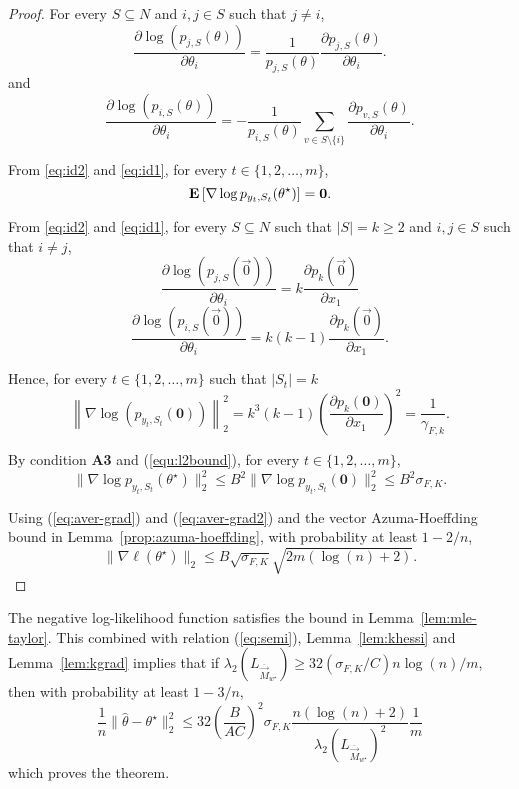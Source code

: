 \begin{proof} For every $S\subseteq N$ and $i,j\in S$ such that $j\neq i$,
\begin{equation}
\frac{\partial \log(p_{j,S} (\theta))}{\partial \theta_i} = \frac{1}{p_{j,S} (\theta)}\frac{\partial p_{j,S} (\theta)}{\partial \theta_i}.
\label{eq:id2}
\end{equation}
and
\begin{equation}
\frac{\partial \log(p_{i,S} (\theta))}{\partial \theta_i} = -\frac{1}{p_{i,S} (\theta)} \sum_{v\in S\setminus \{i\}}\frac{\partial p_{v,S} (\theta)}{\partial \theta_i}.
\label{eq:id1}
\end{equation}

From \eqref{eq:id2} and \eqref{eq:id1}, for every $t\in \{1,2,\ldots,m\}$, 
\begin{equation}
\mathbf{E}\left[\nabla \log p_{y_t,S_t} (\theta^\star) \right]  = {\bm 0}.
\label{eq:aver-grad}
\end{equation}

From \eqref{eq:id2} and \eqref{eq:id1}, for every $S\subseteq N$ such that $|S|=k\geq 2$ and $i,j\in S$ such that $i\neq j$, 
$$
\frac{\partial \log(p_{j,S}(\vec{0}))}{\partial \theta_i} = k \frac{\partial p_k(\vec{0})}{\partial x_1}
$$
$$
\frac{\partial \log(p_{i,S}(\vec{0}))}{\partial \theta_i} = k(k-1)\frac{\partial p_k(\vec{0})}{\partial x_1}.
$$

Hence, for every $t\in \{1,2,\ldots,m\}$ such that $|S_t|=k$
\begin{equation}
\left\|\nabla \log(p_{y_t,S_t} ({\bm 0})) \right\|_2^2  = k^3(k-1)\left(\frac{\partial p_k({\bm 0})}{\partial x_1}\right)^2 = \frac{1}{\gamma_{F,k}}.
\label{equ:l2bound}
\end{equation}

By condition {\bf A3} and (\ref{equ:l2bound}), for every $t\in \{1,2,\ldots,m\}$,
\begin{equation}
\|\nabla \log p_{y_t,S_t} (\theta^\star)\|_2^2 
\leq B^2 \|\nabla \log p_{y_t,S_t} ({\bm 0})\|_2^2 
\leq B^2 \sigma_{F,K}.
\label{eq:aver-grad2}
\end{equation}

Using (\ref{eq:aver-grad}) and (\ref{eq:aver-grad2}) and the vector Azuma-Hoeffding bound in Lemma~\ref{prop:azuma-hoeffding}, with probability at least $1-2/n$,
$$
\|\nabla \ell (\theta^\star) \|_2 \le B\sqrt{\sigma_{F,K}}\sqrt{2m(\log(n) +2)}.
$$
\end{proof}

The negative log-likelihood function satisfies the bound in Lemma~\ref{lem:mle-taylor}. This combined with relation (\ref{eq:semi}), Lemma~\ref{lem:khessi} and Lemma~\ref{lem:kgrad} implies that if $\lambda_2(L_{\overline{\vec{M}}_{w^\star}}) \geq 32 (\sigma_{F,K}/C)n\log(n)/m$, then with probability at least $1-3/n$, 
$$
\frac{1}{n}\|\widehat{\theta}-\theta^\star\|_2^2 \leq 32 \left(\frac{B}{A C}\right)^2 \sigma_{F,K} \frac{n(\log(n)+2)}{\lambda_2(L_{\overline{\vec{M}}_{w^\star}})^2}\frac{1}{m}
$$
which proves the theorem.


